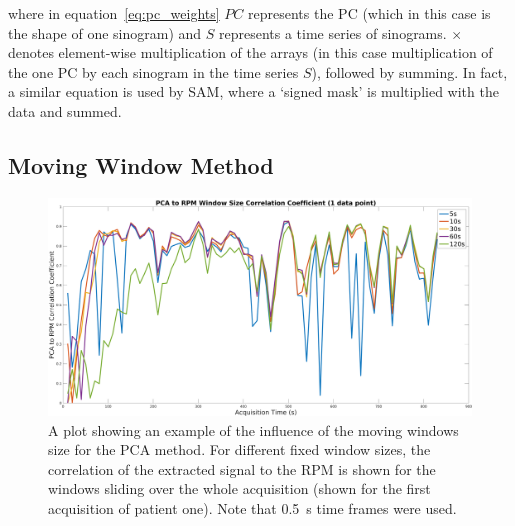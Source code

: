         \noindent where in equation~\ref{eq:pc_weights} $PC$ represents the \gls{PC} (which in this case is the shape of one sinogram) and $S$ represents a time series of sinograms. $\times$ denotes element-wise multiplication of the arrays (in this case multiplication of the one \gls{PC} by each sinogram in the time series $S$), followed by summing. In fact, a similar equation is used by \gls{SAM}, where a `signed mask' is multiplied with the data and summed.
            
    \subsection{Moving Window Method} \label{sec:moving_window_method}
        \begin{figure}
            \centering
            
            \includegraphics[width=1.0\linewidth]{pca_window_correlation_coefficient.png}
            
            \captionsetup{singlelinecheck=false}
            \caption{A plot showing an example of the influence of the moving windows size for the \gls{PCA} method. For different fixed window sizes, the correlation of the extracted signal to the \gls{RPM} is shown for the windows sliding over the whole acquisition (shown for the first acquisition of patient one). Note that \SI{0.5}{\second} time frames were used.}
            \label{fig:pca_window_correlation_coefficient}
        \end{figure}
            
